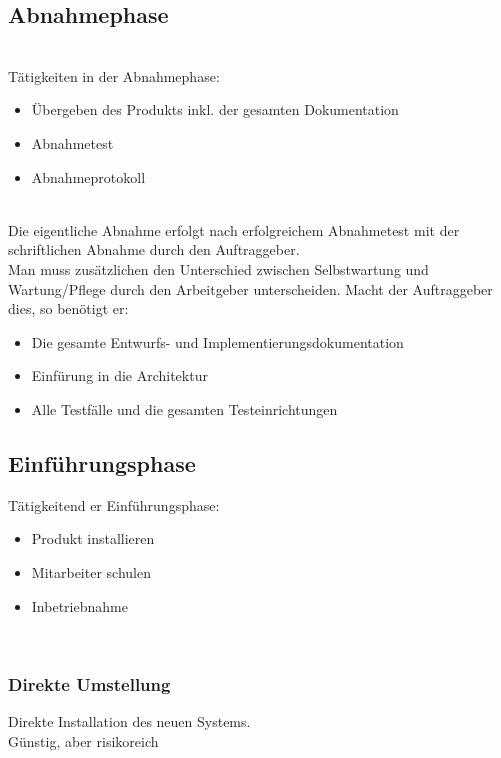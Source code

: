\subsection{Abnahmephase}
\\
Tätigkeiten in der Abnahmephase:
\begin{itemize}
    \item Übergeben des Produkts inkl. der gesamten Dokumentation
    \item Abnahmetest
    \item Abnahmeprotokoll
\end{itemize}
\\
Die eigentliche Abnahme erfolgt nach erfolgreichem Abnahmetest mit der schriftlichen Abnahme durch den Auftraggeber.
\\
Man muss zusätzlichen den Unterschied zwischen Selbstwartung und Wartung/Pflege durch den Arbeitgeber unterscheiden. Macht der Auftraggeber dies, so benötigt er:
\begin{itemize}
    \item Die gesamte Entwurfs- und Implementierungsdokumentation
    \item Einfürung in die Architektur
    \item Alle Testfälle und die gesamten Testeinrichtungen
\end{itemize}

\subsection{Einführungsphase}
Tätigkeitend er Einführungsphase:
\begin{itemize}
    \item Produkt installieren
    \item Mitarbeiter schulen
    \item Inbetriebnahme
\end{itemize}

\\

\subsubsection{Direkte Umstellung}
Direkte Installation des neuen Systems.
\\
Günstig, aber risikoreich

